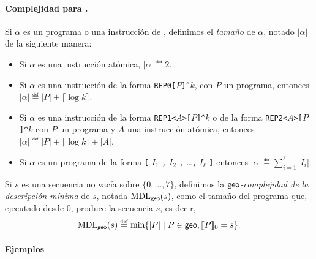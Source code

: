 \paragraph{Complejidad para \gramgeo.} 
Si $\alpha$ es un programa o una instrucción de \gramgeo, definimos el {\em tamaño} de $\alpha$, notado $|\alpha|$ de la siguiente manera:
%
\begin{itemize}
\item Si $\alpha$ es una instrucción atómica, $|\alpha|\eqdef 2$.

\item Si $\alpha$ es una instrucción de la forma 
\verb#REP0[#$P$\verb#]^#$k$, con $P$ un programa, 
entonces $|\alpha|\eqdef |P|+\lceil \log k\rceil$.

\item Si $\alpha$ es una instrucción de la forma 
\verb#REP1<#$A$\verb#>[#$P$\verb#]^#$k$ o de la forma 
\verb#REP2<#$A$\verb#>[#$P$\verb#]^#$k$ 
con $P$ un programa y $A$ una instrucción atómica, 
entonces $|\alpha|\eqdef |P|+\lceil \log k\rceil+|A|$.

\item Si $\alpha$ es un programa de la forma
\verb#[# $I_1$ \verb#,# $I_2$ \verb#,# \dots \verb#,# $I_\ell$ \verb#]#
entonces $|\alpha|\eqdef \sum_{i=1}^\ell|I_i|$.
\end{itemize}
%
Si $s$ es una secuencia no vacía sobre $\{0,\dots,7\}$, definimos la {\em ${\sf geo}$-complejidad de la descripción mínima} de $s$, notada ${\rm MDL}_{{\sf geo}}(s)$, como el tamaño del programa que, ejecutado desde 0, produce la secuencia $s$, es decir,
$$
{\rm MDL}_{{\sf geo}}(s)\stackrel{\scriptscriptstyle \mathrm{def}}{=}\min\{|P|\mid P\in{\sf geo},\llbracket P\rrbracket_0=s\}.
$$



\paragraph{Ejemplos}

